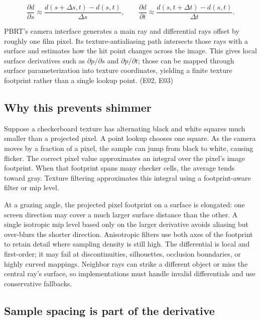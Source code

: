 \[
\frac{\partial d}{\partial s}\approx \frac{d(s+\Delta s,t)-d(s,t)}{\Delta s},\qquad
\frac{\partial d}{\partial t}\approx \frac{d(s,t+\Delta t)-d(s,t)}{\Delta t}.
\]

PBRT's camera interface generates a main ray and differential rays offset by roughly one film pixel. Its texture-antialiasing path intersects those rays with a surface and estimates how the hit point changes across the image. This gives local surface derivatives such as \(\partial p/\partial s\) and \(\partial p/\partial t\); those can be mapped through surface parameterization into texture coordinates, yielding a finite texture footprint rather than a single lookup point. (E02, E03)

\subsection{Why this prevents shimmer}\label{02-foundations-ii-ch036-why-this-prevents-shimmer}

\hypertarget{02-foundations-ii-ch036-why-this-prevents-shimmer}{}

Suppose a checkerboard texture has alternating black and white squares much smaller than a projected pixel. A point lookup chooses one square. As the camera moves by a fraction of a pixel, the sample can jump from black to white, causing flicker. The correct pixel value approximates an integral over the pixel's image footprint. When that footprint spans many checker cells, the average tends toward gray. Texture filtering approximates this integral using a footprint-aware filter or mip level.

At a grazing angle, the projected pixel footprint on a surface is elongated: one screen direction may cover a much larger surface distance than the other. A single isotropic mip level based only on the larger derivative avoids aliasing but over-blurs the shorter direction. Anisotropic filters use both axes of the footprint to retain detail where sampling density is still high. The differential is local and first-order; it may fail at discontinuities, silhouettes, occlusion boundaries, or highly curved mappings. Neighbor rays can strike a different object or miss the central ray's surface, so implementations must handle invalid differentials and use conservative fallbacks.

\subsection{Sample spacing is part of the derivative}\label{02-foundations-ii-ch036-sample-spacing-is-part-of-the-derivative}

